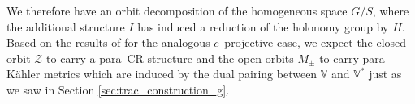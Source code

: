 We therefore have an orbit decomposition of the homogeneous space $G/S$, where the additional structure $I$ has induced a reduction of the holonomy group by ${H}$. Based on the results of \cite{CGH-duke} for the analogous $c$--projective case, we expect the closed orbit $\mathcal{Z}$ to carry a para--CR structure and the open orbits $M_\pm$ to carry para--K\"ahler metrics which are induced by the dual pairing between $\mathbb{V}$ and $\mathbb{V}^*$ just as we saw in Section \ref{sec:trac_construction_g}.






